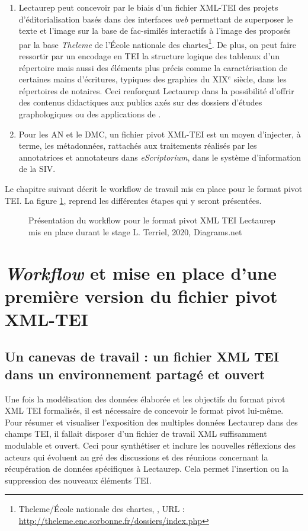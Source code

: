 \begin{enumerate}
    \item Lectaurep peut concevoir par le biais d'un fichier XML-TEI des projets d'éditorialisation basés dans des interfaces \textit{web} permettant de superposer le texte et l'image sur la base de fac-similés interactifs à l'image des  proposés par la base \textit{Theleme} de l'École nationale des chartes\footnote{Theleme/École nationale des chartes, , URL : \url{http://theleme.enc.sorbonne.fr/dossiers/index.php}}.
    De plus, on peut faire ressortir par un encodage en TEI la structure logique des tableaux d'un répertoire mais aussi des éléments plus précis comme la caractérisation de certaines mains d'écritures, typiques des graphies du XIX$^{e}$ siècle, dans les répertoires de notaires. Ceci renforçant Lectaurep dans la possibilité d'offrir des contenus didactiques aux publics axés sur des dossiers d'études graphologiques ou des applications de . 
    \item Pour les AN et le DMC, un fichier pivot XML-TEI est un moyen d'injecter, à terme, les métadonnées, rattachés aux traitements réalisés par les annotatrices et annotateurs dans \textit{eScriptorium}, dans le système d'information de la SIV. 
\end{enumerate}
\bigskip
Le chapitre suivant décrit le workflow de travail mis en place pour le format pivot TEI. La figure \ref{fig:workflow_tei_pivot_lectaurep}, reprend les différentes étapes qui y seront présentées.
\begin{figure}
    \centering
    \centerline{}
    \caption{Présentation du workflow pour le format pivot XML TEI Lectaurep mis en place durant le stage  \textcopyright L. Terriel, 2020, Diagrams.net}
    \label{fig:workflow_tei_pivot_lectaurep}
\end{figure}
\clearpage
\thispagestyle{empty}

\chapter{\textit{Workflow} et mise en place d'une première version du fichier pivot XML-TEI}
\section{Un canevas de travail : un fichier XML TEI dans un environnement partagé et ouvert}
Une fois la modélisation des données élaborée et les objectifs du format pivot XML TEI formalisés, il est nécessaire de concevoir le format pivot lui-même. 
Pour résumer et visualiser l'exposition des multiples données Lectaurep dans des champs TEI, il fallait disposer d'un fichier de travail XML suffisamment modulable et ouvert.
Ceci pour synthétiser et inclure les nouvelles réflexions des acteurs qui évoluent au gré des discussions et des réunions concernant la récupération de données spécifiques à Lectaurep. Cela permet l'insertion ou la suppression des nouveaux éléments TEI.\\

